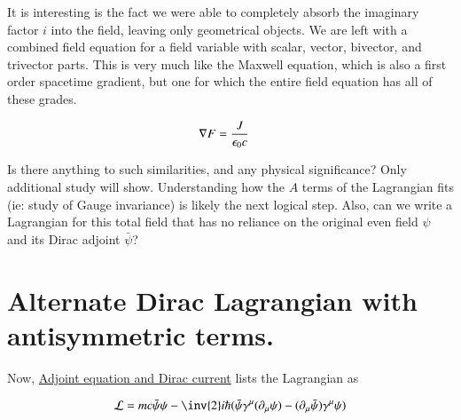 \documentclass{article}
\begin{document}
It is interesting is the fact we were able to completely absorb the imaginary factor $i$ into the field, leaving only geometrical objects.
We are left with a combined field equation for a field variable with scalar, vector, bivector, and trivector parts.  This is very much like the Maxwell equation, which is
also a first order spacetime gradient, but one for which the entire
field equation has all of these grades.

\begin{align*}
\nabla F &= \frac{J}{\epsilon_0 c}
\end{align*}

Is there anything to such similarities, and any physical significance?  Only additional study will show.  Understanding how the $A$ terms of the Lagrangian fits (ie: 
study of Gauge invariance) is likely the next logical step.
Also, can we write a Lagrangian for this total field that has no reliance on the original even field $\psi$
and its Dirac adjoint $\bar\psi$?

\section{ Alternate Dirac Lagrangian with antisymmetric terms. }

Now, 
\href{http://en.wikipedia.org/wiki/Dirac_equation#Adjoint_equation_and_Dirac_current}{Adjoint equation and Dirac current} lists the Lagrangian as

\begin{align*}
\LL = mc \bar{\psi}\psi - {\inv{2}i\hbar}(\bar{\psi}\gamma^\mu (\partial_\mu\psi) - (\partial_\mu\bar{\psi})\gamma^\mu \psi)
\end{align*}



\end{document}
